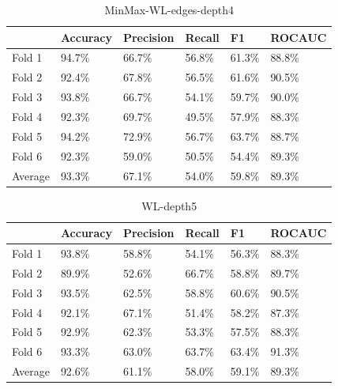 \documentclass{IEEEtran}
\begin{document}
\begin{table}
    \centering
    \begin{tabular}{l||llll|l}
        \textbf{} & \textbf{Accuracy} & \textbf{Precision} & \textbf{Recall} & \textbf{F1} & \textbf{ROCAUC} \\
        \hline \hline
        Fold 1    & 94.7\%            & 66.7\%             & 56.8\%          & 61.3\%      & 88.8\%          \\
        Fold 2    & 92.4\%            & 67.8\%             & 56.5\%          & 61.6\%      & 90.5\%          \\
        Fold 3    & 93.8\%            & 66.7\%             & 54.1\%          & 59.7\%      & 90.0\%          \\
        Fold 4    & 92.3\%            & 69.7\%             & 49.5\%          & 57.9\%      & 88.3\%          \\
        Fold 5    & 94.2\%            & 72.9\%             & 56.7\%          & 63.7\%      & 88.7\%          \\
        Fold 6    & 92.3\%            & 59.0\%             & 50.5\%          & 54.4\%      & 89.3\%          \\
        \hline
        Average   & 93.3\%            & 67.1\%             & 54.0\%          & 59.8\%      & 89.3\%          \\
    \end{tabular}
    \caption{MinMax-WL-edges-depth4}
\end{table}



\begin{table}
    \centering
    \begin{tabular}{l||llll|l}
        \textbf{} & \textbf{Accuracy} & \textbf{Precision} & \textbf{Recall} & \textbf{F1} & \textbf{ROCAUC} \\
        \hline \hline
        Fold 1    & 93.8\%            & 58.8\%             & 54.1\%          & 56.3\%      & 88.3\%          \\
        Fold 2    & 89.9\%            & 52.6\%             & 66.7\%          & 58.8\%      & 89.7\%          \\
        Fold 3    & 93.5\%            & 62.5\%             & 58.8\%          & 60.6\%      & 90.5\%          \\
        Fold 4    & 92.1\%            & 67.1\%             & 51.4\%          & 58.2\%      & 87.3\%          \\
        Fold 5    & 92.9\%            & 62.3\%             & 53.3\%          & 57.5\%      & 88.3\%          \\
        Fold 6    & 93.3\%            & 63.0\%             & 63.7\%          & 63.4\%      & 91.3\%          \\
        \hline
        Average   & 92.6\%            & 61.1\%             & 58.0\%          & 59.1\%      & 89.3\%          \\
    \end{tabular}
    \caption{WL-depth5}
\end{table}
\end{document}

